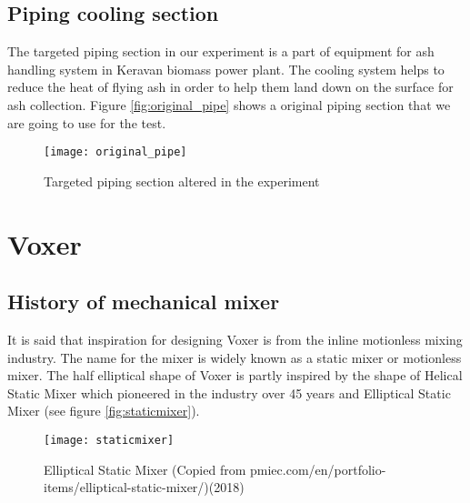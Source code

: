 \subsection{Piping cooling section}

The targeted piping section in our experiment is a part of equipment for ash handling system in Keravan biomass power plant. The cooling system helps to reduce the heat of flying ash in order to help them land down on the surface for ash collection. Figure \vref{fig:original_pipe} shows a original piping section that we are going to use for the test.

\begin{figure}[h]
  \centering
  \texttt{[image: original\_pipe]}
  \caption{ Targeted piping section altered in the experiment}
  \label{fig:original_pipe}
\end{figure}

\section{Voxer}

\subsection{History of mechanical mixer}

It is said that inspiration for designing Voxer is from the inline motionless mixing industry. The name for the mixer is widely known as a static mixer or motionless mixer. The half elliptical shape of Voxer is partly inspired by the shape of Helical Static Mixer which pioneered in the industry over 45 years \cite{stamixco:web} and Elliptical Static Mixer (see figure \vref{fig:staticmixer}).  

\begin{figure}[h]
  \centering
  \texttt{[image: staticmixer]}
  \caption{ Elliptical Static Mixer (Copied from pmiec.com/en/portfolio-items/elliptical-static-mixer/)(2018) \cite{static:web}}
  \label{fig:staticmixer}
\end{figure}

